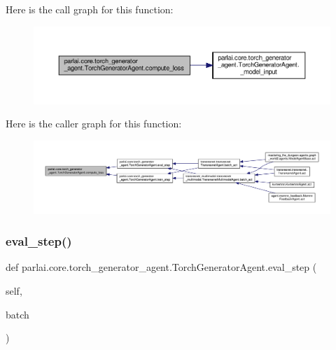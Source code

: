 Here is the call graph for this function\+:
\nopagebreak
\begin{figure}[H]
\begin{center}
\leavevmode
\includegraphics[width=350pt]{classparlai_1_1core_1_1torch__generator__agent_1_1TorchGeneratorAgent_a94808a13bba0d5283613acd98516bd3c_cgraph}
\end{center}
\end{figure}
Here is the caller graph for this function\+:
\nopagebreak
\begin{figure}[H]
\begin{center}
\leavevmode
\includegraphics[width=350pt]{classparlai_1_1core_1_1torch__generator__agent_1_1TorchGeneratorAgent_a94808a13bba0d5283613acd98516bd3c_icgraph}
\end{center}
\end{figure}
\mbox{\label{classparlai_1_1core_1_1torch__generator__agent_1_1TorchGeneratorAgent_ac584268dd08c6fcb0045aa968cad8561}} 
\subsubsection{\texorpdfstring{eval\+\_\+step()}{eval\_step()}}
{\footnotesize\ttfamily def parlai.\+core.\+torch\+\_\+generator\+\_\+agent.\+Torch\+Generator\+Agent.\+eval\+\_\+step (\begin{DoxyParamCaption}\item[{}]{self,  }\item[{}]{batch }\end{DoxyParamCaption})}

